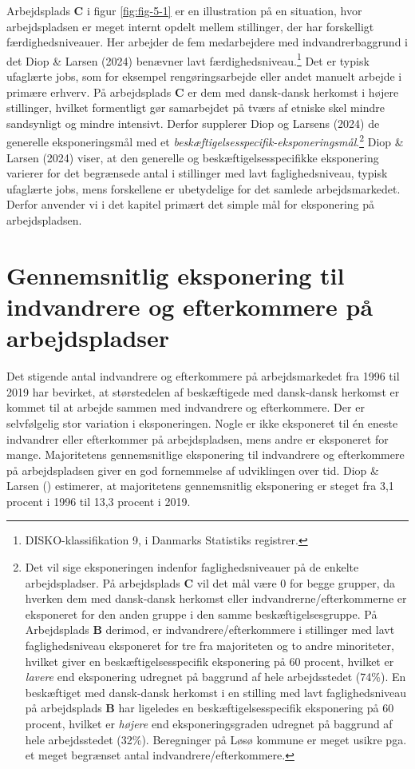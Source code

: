 \documentclass[
]{book}
\begin{document}
Arbejdsplads \textbf{C} i figur \ref{fig:fig-5-1} er en illustration på en situation, hvor arbejdspladsen er meget internt opdelt mellem stillinger, der har forskelligt færdighedsniveauer. Her arbejder de fem medarbejdere med indvandrerbaggrund i det Diop \& Larsen (2024) benævner lavt færdighedsniveau.\footnote{DISKO-klassifikation 9, i Danmarks Statistiks registrer.} Det er typisk ufaglærte jobs, som for eksempel rengøringsarbejde eller andet manuelt arbejde i primære erhverv. På arbejdsplads \textbf{C} er dem med dansk-dansk herkomst i højere stillinger, hvilket formentligt gør samarbejdet på tværs af etniske skel mindre sandsynligt og mindre intensivt. Derfor supplerer Diop og Larsens (2024) de generelle eksponeringsmål med et \emph{beskæftigelsesspecifik-eksponeringsmål}.\footnote{Det vil sige eksponeringen indenfor faglighedsniveauer på de enkelte arbejdspladser. På arbejdsplads \textbf{C} vil det mål være 0 for begge grupper, da hverken dem med dansk-dansk herkomst eller indvandrerne/efterkommerne er eksponeret for den anden gruppe i den samme beskæftigelsesgruppe. På Arbejdsplads \textbf{B} derimod, er indvandrere/efterkommere i stillinger med lavt faglighedsniveau eksponeret for tre fra majoriteten og to andre minoriteter, hvilket giver en beskæftigelsesspecifik eksponering på 60 procent, hvilket er \emph{lavere} end eksponering udregnet på baggrund af hele arbejdsstedet (74\%). En beskæftiget med dansk-dansk herkomst i en stilling med lavt faglighedsniveau på arbejdsplads \textbf{B} har ligeledes en beskæftigelsesspecifik eksponering på 60 procent, hvilket er \emph{højere} end eksponeringsgraden udregnet på baggrund af hele arbejdsstedet (32\%). Beregninger på Løsø kommune er meget usikre pga. et meget begrænset antal indvandrere/efterkommere.} Diop \& Larsen (2024) viser, at den generelle og beskæftigelsesspecifikke eksponering varierer for det begrænsede antal i stillinger med lavt faglighedsniveau, typisk ufaglærte jobs, mens forskellene er ubetydelige for det samlede arbejdsmarkedet. Derfor anvender vi i det kapitel primært det simple mål for eksponering på arbejdspladsen.

\section{Gennemsnitlig eksponering til indvandrere og efterkommere på arbejdspladser}\label{gennemsnitlig-eksponering-til-indvandrere-og-efterkommere-puxe5-arbejdspladser}

Det stigende antal indvandrere og efterkommere på arbejdsmarkedet fra 1996 til 2019 har bevirket, at størstedelen af beskæftigede med dansk-dansk herkomst er kommet til at arbejde sammen med indvandrere og efterkommere. Der er selvfølgelig stor variation i eksponeringen. Nogle er ikke eksponeret til én eneste indvandrer eller efterkommer på arbejdspladsen, mens andre er eksponeret for mange. Majoritetens gennemsnitlige eksponering til indvandrere og efterkommere på arbejdspladsen giver en god fornemmelse af udviklingen over tid. Diop \& Larsen () estimerer, at majoritetens gennemsnitlig eksponering er steget fra 3,1 procent i 1996 til 13,3 procent i 2019.
\end{document}
